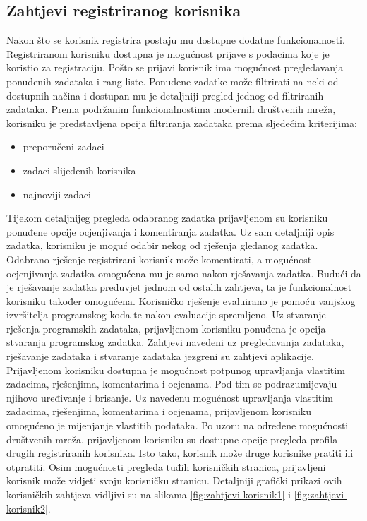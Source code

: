 \documentclass[times, utf8, zavrsni, numeric]{fer}
\begin{document}
			\subsection{Zahtjevi registriranog korisnika}
			Nakon što se korisnik registrira postaju mu dostupne dodatne funkcionalnosti. Registriranom korisniku dostupna je mogućnost prijave s podacima koje je koristio za registraciju. Pošto se prijavi korisnik ima mogućnost pregledavanja ponuđenih zadataka i rang liste. Ponuđene zadatke može filtrirati na neki od dostupnih načina i dostupan mu je detaljniji pregled jednog od filtriranih zadataka. Prema podržanim funkcionalnostima modernih društvenih mreža, korisniku je predstavljena opcija filtriranja zadataka prema sljedećim kriterijima: 
			\begin{itemize}
				\item preporučeni zadaci
				\item zadaci slijeđenih korisnika
				\item najnoviji zadaci
			\end{itemize}
			Tijekom detaljnijeg pregleda odabranog zadatka prijavljenom su korisniku ponuđene opcije ocjenjivanja i komentiranja zadatka. Uz sam detaljniji opis zadatka, korisniku je moguć odabir nekog od rješenja gledanog zadatka. Odabrano rješenje registrirani korisnik može komentirati, a mogućnost ocjenjivanja zadatka omogućena mu je samo nakon rješavanja zadatka. Budući da je rješavanje zadatka preduvjet jednom od ostalih zahtjeva, ta je funkcionalnost korisniku također omogućena. Korisničko rješenje evaluirano je pomoću vanjskog izvršitelja programskog koda te nakon evaluacije spremljeno. Uz stvaranje rješenja programskih zadataka, prijavljenom korisniku ponuđena je opcija stvaranja programskog zadatka. Zahtjevi navedeni uz pregledavanja zadataka, rješavanje zadataka i stvaranje zadataka jezgreni su zahtjevi aplikacije.\\ Prijavljenom korisniku dostupna je mogućnost potpunog upravljanja vlastitim zadacima, rješenjima, komentarima i ocjenama. Pod tim se podrazumijevaju njihovo uređivanje i brisanje. Uz navedenu mogućnost upravljanja vlastitim zadacima, rješenjima, komentarima i ocjenama, prijavljenom korisniku omogućeno je mijenjanje vlastitih podataka. Po uzoru na određene mogućnosti društvenih mreža, prijavljenom korisniku su dostupne opcije pregleda profila drugih registriranih korisnika. Isto tako, korisnik može druge korisnike pratiti ili otpratiti. Osim mogućnosti pregleda tuđih korisničkih stranica, prijavljeni korisnik može vidjeti svoju korisničku stranicu. Detaljniji grafički prikazi ovih korisničkih zahtjeva vidljivi su na slikama \ref{fig:zahtjevi-korisnik1} i \ref{fig:zahtjevi-korisnik2}.
\end{document}
